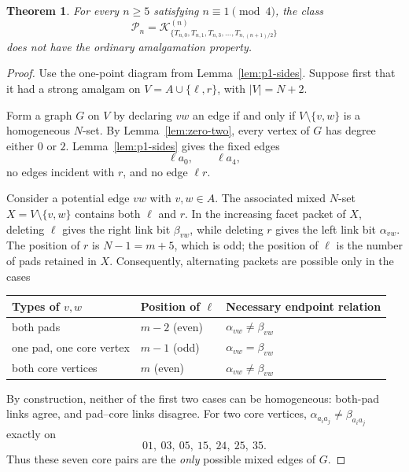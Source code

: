 \documentclass[11pt,a4paper]{article}
\newtheorem{theorem}{Theorem}[section]
\theoremstyle{remark}
\newcommand{\K}{\mathcal K}
\begin{document}
\begin{theorem}\label{thm:p1}
For every $n\geq5$ satisfying $n\equiv1\pmod4$, the class
\[
 \boxed{\mathcal P_n
 =\K^{(n)}_{\{T_{n,0},T_{n,1},T_{n,3},\ldots,T_{n,(n+1)/2}\}}}
\]
does not have the ordinary amalgamation property.
\end{theorem}
\begin{proof}
Use the one-point diagram from Lemma~\ref{lem:p1-sides}.
Suppose first that it had a strong amalgam on
$V=A\cup\{\ell,r\}$, with $|V|=N+2$.

Form a graph $G$ on $V$ by declaring $vw$ an edge if and only if
$V\setminus\{v,w\}$ is a homogeneous $N$-set. By
Lemma~\ref{lem:zero-two}, every vertex of $G$ has degree either $0$ or $2$.
Lemma~\ref{lem:p1-sides} gives the fixed edges
\begin{equation}\label{eq:fixed-edges}
 \ell a_0,\qquad \ell a_4,
\end{equation}
no edges incident with $r$, and no edge $\ell r$.

Consider a potential edge $vw$ with $v,w\in A$. The associated
mixed $N$-set $X=V\setminus\{v,w\}$ contains both $\ell$ and $r$.
In the increasing facet packet of $X$, deleting $\ell$ gives the
right link bit $\beta_{vw}$, while deleting $r$ gives the left link
bit $\alpha_{vw}$. The position of $r$ is $N-1=m+5$, which is odd;
the position of $\ell$ is the number of pads retained in $X$.
Consequently, alternating packets are possible only in the cases
\begin{center}
\begin{tabular}{@{}lll@{}}
\toprule
Types of $v,w$ & Position of $\ell$ & Necessary endpoint relation\\
\midrule
both pads & $m-2$ (even) & $\alpha_{vw}\ne\beta_{vw}$\\
one pad, one core vertex & $m-1$ (odd) & $\alpha_{vw}=\beta_{vw}$\\
both core vertices & $m$ (even) & $\alpha_{vw}\ne\beta_{vw}$\\
\bottomrule
\end{tabular}
\end{center}
By construction, neither of the first two cases can be homogeneous:
both-pad links agree, and pad--core links disagree. For two core
vertices, $\alpha_{a_i a_j}\ne\beta_{a_i a_j}$ exactly on
\begin{equation}\label{eq:eligible}
 01,\ 03,\ 05,\ 15,\ 24,\ 25,\ 35.
\end{equation}
Thus these seven core pairs are the \emph{only} possible mixed edges of $G$.


\end{proof}
\end{document}
